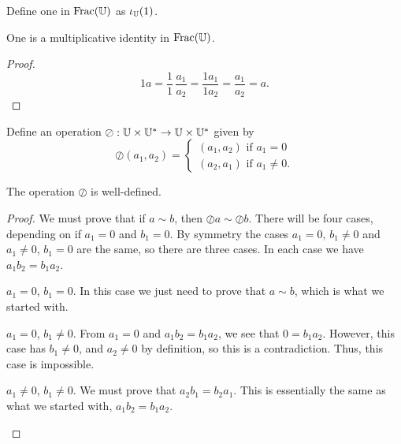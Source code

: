 \documentclass[../../math.tex]{subfiles}
\begin{document}
\begin{instance}
    Define one in $\operatorname{Frac}(\mathbb{U})$ as $\iota_{\mathbb{U}}(1)$.
\end{instance}

\begin{instance}
    One is a multiplicative identity in $\operatorname{Frac}(\mathbb{U})$.
\end{instance}
\begin{proof}
    \[
        1a
        = \frac{1}{1} \, \frac{a_1}{a_2}
        = \frac{1a_1}{1a_2}
        = \frac{a_1}{a_2}
        = a.
    \]
\end{proof}

\begin{definition}
    Define an operation $\oslash : \mathbb{U} \times \mathbb{U}^* \to \mathbb{U} \times \mathbb{U}^*$ given by
    \[
        \oslash(a_1, a_2) = \begin{cases}
            (a_1, a_2) \text{ if $a_1 = 0$} \\
            (a_2, a_1) \text{ if $a_1 \neq 0$}.
        \end{cases}
    \]
\end{definition}

\begin{lemma}
    The operation $\oslash$ is well-defined.
\end{lemma}
\begin{proof}
    We must prove that if $a \sim b$, then $\oslash a \sim \oslash b$.  There
    will be four cases, depending on if $a_1 = 0$ and $b_1 = 0$.  By symmetry
    the cases $a_1 = 0$, $b_1 \neq 0$ and $a_1 \neq 0$, $b_1 = 0$ are the same,
    so there are three cases.  In each case we have $a_1b_2 = b_1a_2$.
    \begin{case} $a_1 = 0$, $b_1 = 0$.
        In this case we just need to prove that $a \sim b$, which is what we
        started with.
    \end{case}
    \begin{case} $a_1 = 0$, $b_1 \neq 0$.
        From $a_1 = 0$ and $a_1b_2 = b_1a_2$, we see that $0 = b_1a_2$.
        However, this case has $b_1 \neq 0$, and $a_2 \neq 0$ by definition, so
        this is a contradiction.  Thus, this case is impossible.
    \end{case}
    \begin{case} $a_1 \neq 0$, $b_1 \neq 0$.
        We must prove that $a_2b_1 = b_2a_1$.  This is essentially the same as
        what we started with, $a_1b_2 = b_1a_2$.
    \end{case}
\end{proof}
\end{document}
